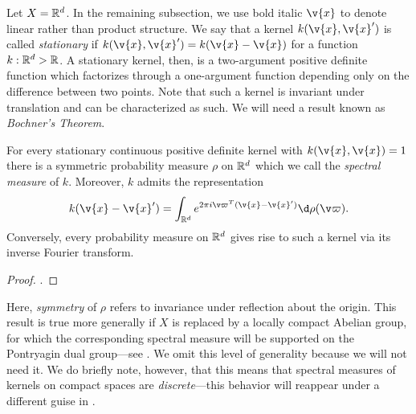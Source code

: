 \documentclass[11pt]{book}
\begin{document}
Let $X = \mathbb{R}^d$.
In the remaining subsection, we use bold italic $\v{x}$ to denote linear rather than product structure.
We say that a kernel $k(\v{x},\v{x}')$ is called \emph{stationary} if $k(\v{x},\v{x}') = k(\v{x} - \v{x})$ for a function $k : \mathbb{R}^d \-> \mathbb{R}$.
A stationary kernel, then, is a two-argument positive definite function which factorizes through a one-argument function depending only on the difference between two points.
Note that such a kernel is invariant under translation and can be characterized as such.
We will need a result known as \emph{Bochner's Theorem}.

\begin{result}
For every stationary continuous positive definite kernel with $k(\v{x},\v{x}) = 1$ there is a symmetric probability measure $\rho$ on $\mathbb{R}^d$ which we call the \emph{spectral measure} of $k$.
Moreover, $k$ admits the representation
\[
k(\v{x} - \v{x}') = \int_{\R^d} e^{2\pi i \v\varpi^T (\v{x} - \v{x}')} \d\rho(\v\varpi)
.
\]
Conversely, every probability measure on $\mathbb{R}^d$ gives rise to such a kernel via its inverse Fourier transform.
\end{result}

\begin{proof}
\textcite[Theorem 10.4]{paulsen16}.
\end{proof}

Here, \emph{symmetry} of $\rho$ refers to invariance under reflection about the origin.
This result is true more generally if $X$ is replaced by a locally compact Abelian group, for which the corresponding spectral measure will be supported on the Pontryagin dual group---see \textcite{paulsen16}. 
We omit this level of generality because we will not need it.
We do briefly note, however, that this means that spectral measures of kernels on compact spaces are \emph{discrete}---this behavior will reappear under a different guise in .
\end{document}
